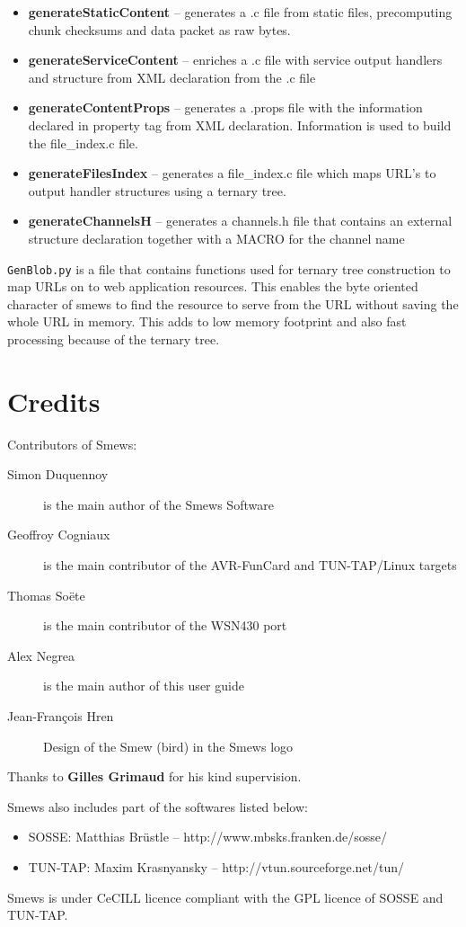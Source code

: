 \documentclass{report}
\begin{document}
\begin{itemize}
\item \textbf{generateStaticContent} -- generates a .c file from static files, precomputing chunk checksums and data packet as raw bytes.
\item \textbf{generateServiceContent} -- enriches a .c file with service output handlers and structure from XML declaration from the .c file
\item \textbf{generateContentProps} -- generates a .props file with the information declared in property tag from XML declaration. Information is used to build the file\_index.c file.
\item \textbf{generateFilesIndex} -- generates a file\_index.c file which maps URL's to output handler structures using a ternary tree.
\item \textbf{generateChannelsH} -- generates a channels.h file that contains an external structure declaration together with a MACRO for the channel name
\end{itemize}

\texttt{GenBlob.py} is a file that contains functions used for ternary tree construction to map URLs on to web application resources. This enables the byte oriented character of smews to find the resource to serve from the URL without saving the whole URL in memory. This adds
to low memory footprint and also fast processing because of the ternary tree.

\chapter{Credits}

Contributors of Smews:


\begin{description}
 \item[Simon Duquennoy] is the main author of the Smews Software
 \item[Geoffroy Cogniaux] is the main contributor of the AVR-FunCard and TUN-TAP/Linux targets
 \item[Thomas So\"{e}te] is the main contributor of the WSN430 port
 \item[Alex Negrea] is the main author of this user guide
 \item[Jean-Fran\c{c}ois Hren] Design of the Smew (bird) in the Smews logo
\end{description}
Thanks to \textbf{Gilles Grimaud} for his kind supervision.

Smews also includes part of the softwares listed below:
\begin{itemize}
 \item SOSSE: Matthias Br\"{u}stle -- http://www.mbsks.franken.de/sosse/
 \item TUN-TAP: Maxim Krasnyansky -- http://vtun.sourceforge.net/tun/
\end{itemize}

Smews is under CeCILL licence compliant with the GPL licence of SOSSE and TUN-TAP.
\end{document}
